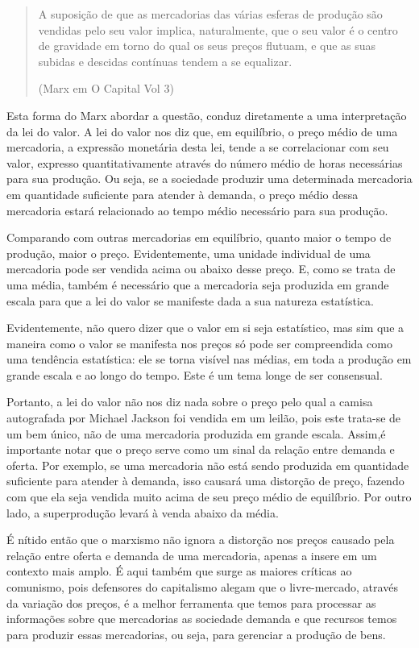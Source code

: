 \begin{quote}
A suposição de que as mercadorias das várias esferas de produção são vendidas pelo seu valor implica, naturalmente, que o seu valor é o centro de gravidade em torno do qual os seus preços flutuam, e que as suas subidas e descidas contínuas tendem a se equalizar.

(Marx em O Capital Vol 3)
\end{quote}

Esta forma do Marx abordar a questão, conduz diretamente a uma interpretação da lei do valor.  A lei do valor nos diz que, em equilíbrio, o preço médio de uma mercadoria, a expressão monetária desta lei, tende a se correlacionar com seu valor, expresso quantitativamente através do número médio de horas necessárias para sua produção. Ou seja, se a sociedade produzir uma determinada mercadoria em quantidade suficiente para atender à demanda, o preço médio dessa mercadoria estará relacionado ao tempo médio necessário para sua produção. 

Comparando com outras mercadorias em equilíbrio, quanto maior o tempo de produção, maior o preço. Evidentemente, uma unidade individual de uma mercadoria pode ser vendida acima ou abaixo desse preço. E, como se trata de uma média, também é necessário que a mercadoria seja produzida em grande escala para que a lei do valor se manifeste dada a sua natureza estatística.

Evidentemente, não quero dizer que o valor em si seja estatístico, mas sim que a maneira como o valor se manifesta nos preços só pode ser compreendida como uma tendência estatística: ele se torna visível nas médias, em toda a produção em grande escala e ao longo do tempo. Este é um tema longe de ser consensual.

Portanto, a lei do valor não nos diz nada sobre o preço pelo qual a camisa autografada por Michael Jackson foi vendida em um leilão, pois este trata-se de um bem único, não de uma mercadoria produzida em grande escala. Assim,é importante notar que o preço serve como um sinal da relação entre demanda e oferta. Por exemplo, se uma mercadoria não está sendo produzida em quantidade suficiente para atender à demanda, isso causará uma distorção de preço, fazendo com que ela seja vendida muito acima de seu preço médio de equilíbrio. Por outro lado, a superprodução levará à venda abaixo da média.

É nítido então que o marxismo não ignora a distorção nos preços causado pela relação entre oferta e demanda de uma mercadoria, apenas a insere em um contexto mais amplo. É aqui também que surge as maiores críticas ao comunismo, pois defensores do capitalismo alegam que o livre-mercado, através da variação dos preços, é a melhor ferramenta que temos para processar as informações sobre que mercadorias as sociedade demanda e que recursos temos para produzir essas mercadorias, ou seja, para gerenciar a produção de bens.

